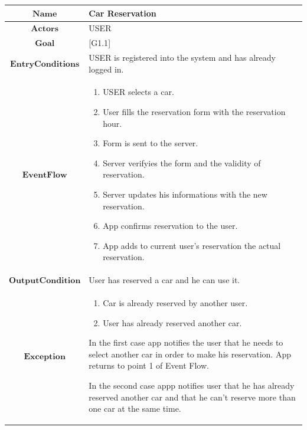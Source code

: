 \begin{tabular}{|c|>{\raggedright}p{10cm}|}
\hline 
$\boldsymbol{\mathbf{Name}}$ & Car Reservation\tabularnewline
\hline 
$\mathbf{Actors}$ & USER\tabularnewline
\hline 
$\mathbf{Goal}$ & {[}G1.1{]}\tabularnewline
\hline 
$\mathbf{EntryConditions}$ & USER is registered into the system and has already logged in.\tabularnewline
\hline 
$\mathbf{EventFlow}$ & \begin{enumerate}
\item USER selects a car.
\item User fills the reservation form with the reservation hour.
\item Form is sent to the server.
\item Server verifyies the form and the validity of reservation.
\item Server updates his informations with the new reservation.
\item App confirms reservation to the user.
\item App adds to current user's reservation the actual reservation.
\end{enumerate}
\tabularnewline
\hline 
$\mathbf{OutputCondition}$ & User has reserved a car and he can use it.\tabularnewline
\hline 
$\mathbf{Exception}$ & \begin{enumerate}
\item Car is already reserved by another user.
\item User has already reserved another car.
\end{enumerate}
In the first case app notifies the user that he needs to select another
car in order to make his reservation. App returns to point 1 of Event
Flow.

In the second case appp notifies user that he has already reserved
another car and that he can't reserve more than one car at the same
time.\tabularnewline
\hline 
\end{tabular}\\
\\


